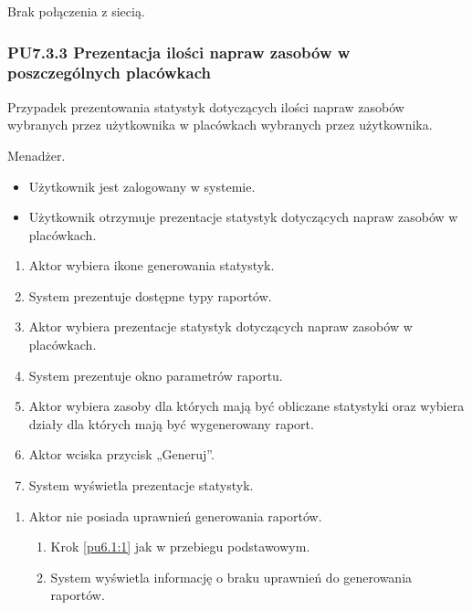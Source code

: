Brak połączenia z siecią.

\subsubsection{PU7.3.3 Prezentacja ilości napraw zasobów w poszczególnych placówkach}
Przypadek prezentowania statystyk dotyczących ilości napraw zasobów wybranych przez użytkownika w placówkach wybranych przez użytkownika.

Menadżer.

\begin{itemize}
\item Użytkownik jest zalogowany w systemie.
\end{itemize}

\begin{itemize}
\item Użytkownik otrzymuje prezentacje statystyk dotyczących napraw zasobów w placówkach.
\end{itemize}

\begin{enumerate}
	\item \label{pu7.3.3:1} Aktor wybiera ikone generowania statystyk.
	\item System prezentuje dostępne typy raportów.
	\item \label{pu7.3.3:2} Aktor wybiera prezentacje statystyk dotyczących napraw zasobów w placówkach.
	\item System prezentuje okno parametrów raportu.
	\item Aktor wybiera zasoby dla których mają być obliczane statystyki oraz wybiera działy dla których mają być wygenerowany raport.
	\item Aktor wciska przycisk „Generuj”.
	\item System wyświetla prezentacje statystyk.
\end{enumerate}

\begin{enumerate}
	\item Aktor nie posiada uprawnień generowania raportów.
	\begin{enumerate}[label*=\arabic*.]
		\item Krok \ref{pu6.1:1} jak w przebiegu podstawowym.
		\item System wyświetla informację o braku uprawnień do generowania raportów.
	\end{enumerate}
\end{enumerate}

